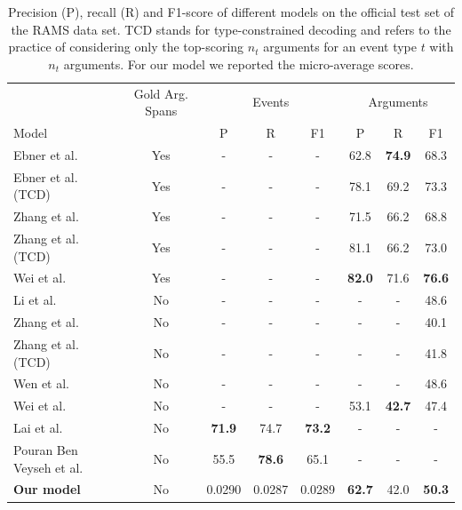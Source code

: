 \documentclass[runningheads]{llncs}
\begin{document}
\begin{table}
    \caption{Precision (P), recall (R) and F1-score of different models on the official test set of the RAMS data set. TCD stands for type-constrained decoding and refers to the practice of considering only the top-scoring $n_t$ arguments for an event type $t$ with $n_t$ arguments. For our model we reported the micro-average scores.}
    \label{tab:historical_events:event-arguments}
    \centering
    \begin{tabular}{lccccccc}
        \toprule
        & Gold Arg. Spans & \multicolumn{3}{c}{Events} & \multicolumn{3}{c}{Arguments} \\
        Model & & P & R & F1 & P & R & F1\\
        \midrule
        Ebner et al.~\cite{ebner-etal-2020-rams} & Yes & - & - & - & 62.8 & \textbf{74.9} & 68.3 \\
        Ebner et al. (TCD)~\cite{ebner-etal-2020-rams} & Yes & - & - & - & 78.1 & 69.2 & 73.3 \\
        Zhang et al.~\cite{zhang-etal-2020-two} & Yes & - & - & -  & 71.5 & 66.2 & 68.8 \\
        Zhang et al. (TCD)~\cite{zhang-etal-2020-two} & Yes & - & - & -  & 81.1 & 66.2 & 73.0 \\
        Wei et al.~\cite{wei-etal-2021-trigger} & Yes & - & - & - & \textbf{82.0} & 71.6 & \textbf{76.6} \\
        \hline
        Li et al.~\cite{li-etal-2021-genarg} & No & - & - & - & - & - & 48.6 \\
        Zhang et al.~\cite{zhang-etal-2020-two} & No & - & - & -  & - & - & 40.1 \\
        Zhang et al. (TCD)~\cite{zhang-etal-2020-two} & No & - & - & -  & - & - & 41.8 \\
        Wen et al.~\cite{wen-etal-2021-resin} & No & - & - & - & - & - & 48.6 \\
        Wei et al.~\cite{wei-etal-2021-trigger} & No & - & - & - & 53.1 & \textbf{42.7} & 47.4 \\
        Lai et al.~\cite{lai-etal-2021-event} & No & \textbf{71.9} & 74.7 & \textbf{73.2} & - & - & - \\
        Pouran Ben Veyseh et al.~\cite{pouran-ben-veyseh-etal-2021-unleash} & No & 55.5 & \textbf{78.6} & 65.1 & - & - & - \\
        \textbf{Our model} & No & 0.0290 & 0.0287 & 0.0289 & \textbf{62.7} & 42.0 & \textbf{50.3} \\
        \bottomrule
    \end{tabular}
\end{table}
\end{document}
